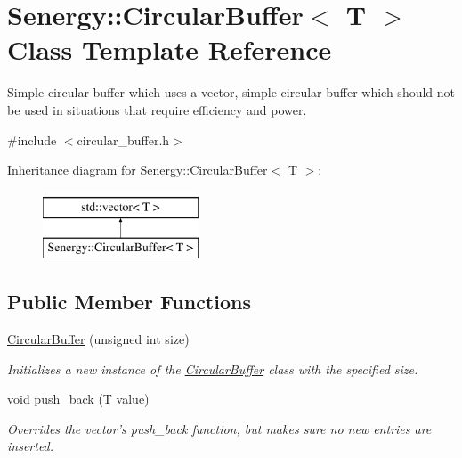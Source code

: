 \hypertarget{class_senergy_1_1_circular_buffer}{\section{Senergy\-:\-:Circular\-Buffer$<$ T $>$ Class Template Reference}
\label{class_senergy_1_1_circular_buffer}
}


Simple circular buffer which uses a vector, simple circular buffer which should not be used in situations that require efficiency and power.  




{\ttfamily \#include $<$circular\-\_\-buffer.\-h$>$}

Inheritance diagram for Senergy\-:\-:Circular\-Buffer$<$ T $>$\-:\begin{figure}[H]
\begin{center}
\leavevmode
\includegraphics[height=2.000000cm]{class_senergy_1_1_circular_buffer}
\end{center}
\end{figure}
\subsection*{Public Member Functions}
\begin{DoxyCompactItemize}
\item 
\hyperlink{class_senergy_1_1_circular_buffer_abc3a5a67343d46ce83e2bbf678e83393}{Circular\-Buffer} (unsigned int size)
\begin{DoxyCompactList}\small\item\em Initializes a new instance of the \hyperlink{class_senergy_1_1_circular_buffer}{Circular\-Buffer} class with the specified size. \end{DoxyCompactList}\item 
void \hyperlink{class_senergy_1_1_circular_buffer_a26e52b6923a05022fcac2f825aa907cb}{push\-\_\-back} (T value)
\begin{DoxyCompactList}\small\item\em Overrides the vector's push\-\_\-back function, but makes sure no new entries are inserted. \end{DoxyCompactList}\end{DoxyCompactItemize}


